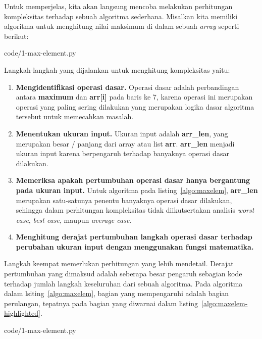 Untuk memperjelas, kita akan langsung mencoba melakukan perhitungan kompleksitas terhadap sebuah algoritma sederhana. Misalkan kita memiliki algoritma untuk menghitung nilai maksimum di dalam sebuah \textit{array} seperti berikut:


                {code/1-max-element.py}

\FloatBarrier

Langkah-langkah yang dijalankan untuk menghitung kompleksitas yaitu:

\begin{enumerate}
    \item \textbf{Mengidentifikasi operasi dasar.} Operasi dasar adalah perbandingan antara \textbf{maximum} dan \textbf{arr[i]} pada baris ke 7, karena operasi ini merupakan operasi yang paling sering dilakukan yang merupakan logika dasar algoritma tersebut untuk memecahkan masalah.
    \item \textbf{Menentukan ukuran input.} Ukuran input adalah \textbf{arr\_len}, yang merupakan besar / panjang dari array atau list \textbf{arr}. \textbf{arr\_len} menjadi ukuran input karena berpengaruh terhadap banyaknya operasi dasar dilakukan.
    \item \textbf{Memeriksa apakah pertumbuhan operasi dasar hanya bergantung pada ukuran input.} Untuk algoritma pada listing~\ref{algo:maxelem}, \textbf{arr\_len} merupakan satu-satunya penentu banyaknya operasi dasar dilakukan, sehingga dalam perhitungan kompleksitas tidak diikutsertakan analisis \textit{worst case}, \textit{best case}, maupun \textit{average case}.
    \item \textbf{Menghitung derajat pertumbuhan langkah operasi dasar terhadap perubahan ukuran input dengan menggunakan fungsi matematika.} 
\end{enumerate}

Langkah keempat memerlukan perhitungan yang lebih mendetail. Derajat pertumbuhan yang dimaksud adalah seberapa besar pengaruh sebagian kode terhadap jumlah langkah keseluruhan dari sebuah algoritma. Pada algoritma dalam lsiting~\ref{algo:maxelem}, bagian yang mempengaruhi adalah bagian perulangan, tepatnya pada bagian yang diwarnai dalam listing~\ref{algo:maxelem-highlighted}.


                {code/1-max-element.py}

